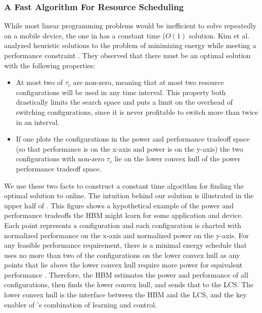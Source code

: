 \subsubsection{A Fast Algorithm For Resource Scheduling}
While most linear programming problems would be inefficient to solve
repeatedly on a mobile device, the one in  has a
constant time ($O(1)$ solution.  Kim et al. analyzed heuristic
solutions to the problem of minimizing energy while meeting a
performance constraint \cite{kim-cpsna}.  They observed that there
must be an optimal solution with the following properties:
\begin{itemize}
\item At most two of $\tau_c$ are non-zero, meaning that at most two
  resource configurations will be used in any time interval.  This
  property both drastically limits the search space and puts a limit
  on the overhead of switching configurations, since it is never
  profitable to switch more than twice in an interval.
\item If one plots the configurations in the power and performance
  tradeoff space (so that performance is on the x-axis and power is on
  the y-axis) the two configurations with non-zero $\tau_c$ lie on the
  lower convex hull of the power performance tradeoff space.
\end{itemize}
We use these two facts to construct a constant time algorithm for
finding the optimal solution to  online.  The
intuition behind our solution is illustrated in the upper half of
.  This figure shows a hypothetical example of the power
and performance tradeoffs the HBM might learn for some application and
device.  Each point represents a configuration and each configuration
is charted with normalized performance on the x-axis and normalized
power on the y-axis.  For any feasible performance requirement, there
is a minimal energy schedule that uses no more than two of the
configurations on the lower convex hull as any points that lie above
the lower convex hull require more power for equivalent performance
\cite{kim-cpsna}.  Therefore, the HBM estimates the power and
performance of all configurations, then finds the lower convex hull,
and sends that to the LCS.  The lower convex hull is the interface
between the HBM and the LCS, and the key enabler of \SYSTEM{}'s
combination of learning and control.





